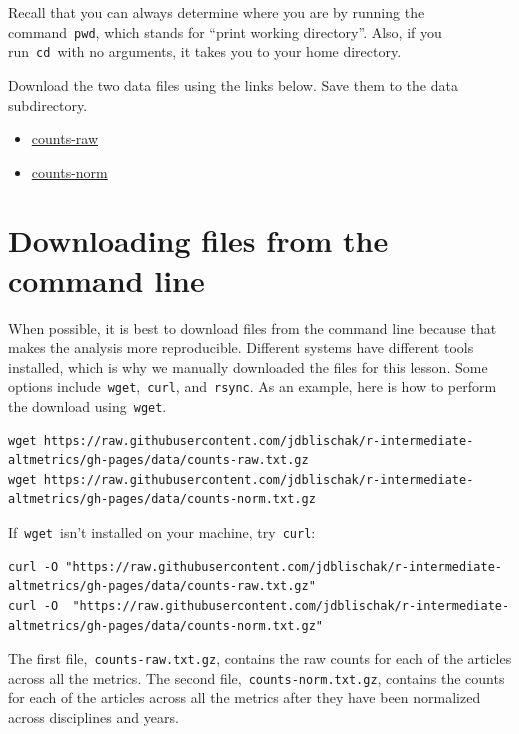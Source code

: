 \documentclass[
]{book}
\providecommand{\tightlist}{%
  \setlength{\itemsep}{0pt}\setlength{\parskip}{0pt}}
\begin{document}
Recall that you can always determine where you are by running the command~\texttt{pwd}, which stands for ``print working directory''. Also, if you run~\texttt{cd}~with no arguments, it takes you to your home directory.

Download the two data files using the links below. Save them to the data subdirectory.

\begin{itemize}
\tightlist
\item
  \href{https://raw.githubusercontent.com/jdblischak/r-intermediate-altmetrics/gh-pages/data/counts-raw.txt.gz}{counts-raw}
\item
  \href{https://raw.githubusercontent.com/jdblischak/r-intermediate-altmetrics/gh-pages/data/counts-norm.txt.gz}{counts-norm}
\end{itemize}

\hypertarget{downloading-files-from-the-command-line}{%
\section{Downloading files from the command line}\label{downloading-files-from-the-command-line}}

When possible, it is best to download files from the command line because that makes the analysis more reproducible. Different systems have different tools installed, which is why we manually downloaded the files for this lesson. Some options include~\texttt{wget},~\texttt{curl}, and~\texttt{rsync}. As an example, here is how to perform the download using~\texttt{wget}.

\begin{verbatim}
wget https://raw.githubusercontent.com/jdblischak/r-intermediate-altmetrics/gh-pages/data/counts-raw.txt.gz
wget https://raw.githubusercontent.com/jdblischak/r-intermediate-altmetrics/gh-pages/data/counts-norm.txt.gz
\end{verbatim}

If~\texttt{wget}~isn't installed on your machine, try~\texttt{curl}:

\begin{verbatim}
curl -O "https://raw.githubusercontent.com/jdblischak/r-intermediate-altmetrics/gh-pages/data/counts-raw.txt.gz"
curl -O  "https://raw.githubusercontent.com/jdblischak/r-intermediate-altmetrics/gh-pages/data/counts-norm.txt.gz"
\end{verbatim}

The first file,~\texttt{counts-raw.txt.gz}, contains the raw counts for each of the articles across all the metrics. The second file,~\texttt{counts-norm.txt.gz}, contains the counts for each of the articles across all the metrics after they have been normalized across disciplines and years.
\end{document}
